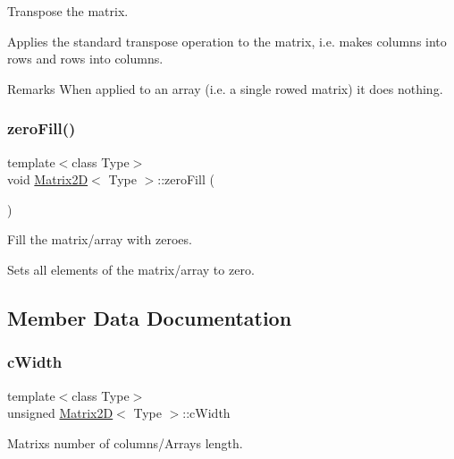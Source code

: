 Transpose the matrix. 

Applies the standard transpose operation to the matrix, i.\+e. makes columns into rows and rows into columns. \begin{DoxyRemark}{Remarks}
When applied to an array (i.\+e. a single rowed matrix) it does nothing. 
\end{DoxyRemark}
\mbox{\label{classMatrix2D_a64929341625696e9500aa9b6d51a8ae6}} 
\subsubsection{\texorpdfstring{zero\+Fill()}{zeroFill()}}
{\footnotesize\ttfamily template$<$class Type$>$ \\
void \hyperlink{classMatrix2D}{Matrix2D}$<$ Type $>$\+::zero\+Fill (\begin{DoxyParamCaption}{ }\end{DoxyParamCaption})\hspace{0.3cm}{\ttfamily [inline]}}



Fill the matrix/array with zeroes. 

Sets all elements of the matrix/array to zero. 

\subsection{Member Data Documentation}
\mbox{\label{classMatrix2D_ad30f0f3c259aaa26ddda2b4d17eddef2}} 
\subsubsection{\texorpdfstring{c\+Width}{cWidth}}
{\footnotesize\ttfamily template$<$class Type$>$ \\
unsigned \hyperlink{classMatrix2D}{Matrix2D}$<$ Type $>$\+::c\+Width\hspace{0.3cm}{\ttfamily [private]}}

Matrix\textquotesingle{}s number of columns/\+Array\textquotesingle{}s length. \mbox{\label{classMatrix2D_a6e702a96baba89ad29226ceb44676e2b}} 
